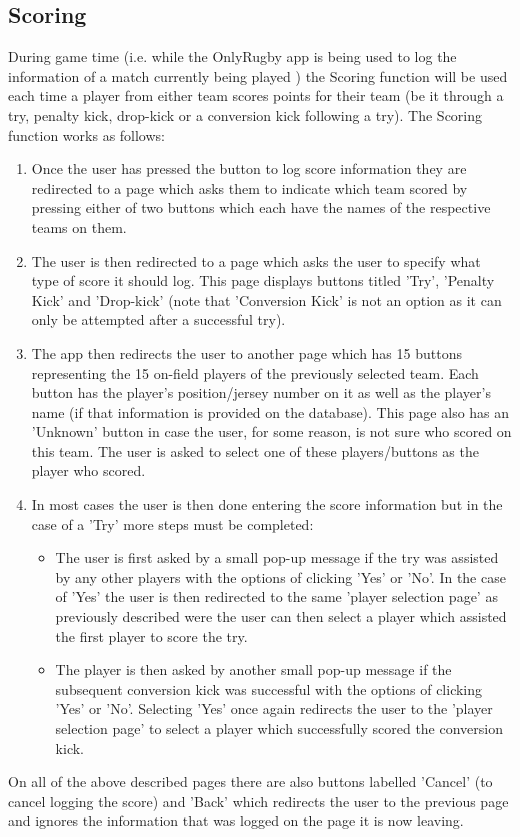 \documentclass[hidelinks,a4paper,12pt]{article}
\begin{document}
	\subsection{Scoring}
		During game time (i.e. while the OnlyRugby app is being used to log the information of a match currently being played ) the Scoring function will be used each time a player from either team scores points for their team (be it through a try, penalty kick, drop-kick or a conversion kick following a try). The Scoring function works as follows:
		\begin{enumerate}
			\item Once the user has pressed the button to log score information they are redirected to a page which asks them to indicate which team scored by pressing either of two buttons which each have the names of the respective teams on them.
			\item The user is then redirected to a page which asks the user to specify what type of score it should log. This page displays buttons titled 'Try', 'Penalty Kick' and  'Drop-kick' (note that 'Conversion Kick' is not an option as it can only be attempted after a successful try). 
			\item The app then redirects the user to another page which has 15 buttons representing the 15 on-field players of the previously selected team. Each button has the player's position/jersey number on it as well as the player's name (if that information is provided on the database). This page also has an 'Unknown' button in case the user, for some reason, is not sure who scored on this team. The user is asked to select one of these players/buttons as the player who scored.
			\item In most cases the user is then done entering the score information but in the case of a 'Try' more steps must be completed:
				\begin{itemize}
					\item The user is first asked by a small pop-up message if the try was assisted by any other players with the options of clicking 'Yes' or 'No'. In the case of 'Yes' the user is then redirected to the same 'player selection page' as previously described were the user can then select a player which assisted the first player to score the try.
					\item The player is then asked by another small pop-up message if the subsequent conversion kick was successful with the options of clicking 'Yes' or 'No'. Selecting 'Yes' once again redirects the user to the 'player selection page' to select a player which successfully scored the conversion kick.
				\end{itemize}
		\end{enumerate}
	On all of the above described pages there are also buttons labelled 'Cancel' (to cancel logging the score) and 'Back' which redirects the user to the previous page and ignores the information that was logged on the page it is now leaving.
\end{document}
